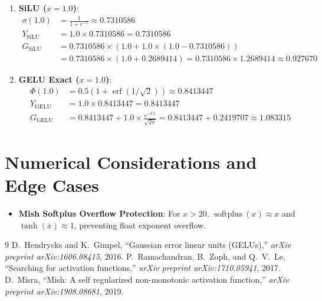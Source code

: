 \documentclass[11pt,a4paper]{article}
\theoremstyle{definition}
\begin{document}
\begin{enumerate}
    \item \textbf{SiLU ($x=1.0$)}:
    \begin{align}
    \sigma(1.0) &= \frac{1}{1 + e^{-1}} \approx 0.7310586 \\
    Y_{\text{SiLU}} &= 1.0 \times 0.7310586 = 0.7310586 \\
    G_{\text{SiLU}} &= 0.7310586 \times (1.0 + 1.0 \times (1.0 - 0.7310586)) \\
    &= 0.7310586 \times (1.0 + 0.2689414) = 0.7310586 \times 1.2689414 \approx 0.927670
    \end{align}
    \item \textbf{GELU Exact ($x=1.0$)}:
    \begin{align}
    \Phi(1.0) &= 0.5(1 + \operatorname{erf}(1/\sqrt{2})) \approx 0.8413447 \\
    Y_{\text{GELU}} &= 1.0 \times 0.8413447 = 0.8413447 \\
    G_{\text{GELU}} &= 0.8413447 + 1.0 \times \frac{e^{-0.5}}{\sqrt{2\pi}} = 0.8413447 + 0.2419707 \approx 1.083315
    \end{align}
\end{enumerate}

\section{Numerical Considerations and Edge Cases}

\begin{itemize}
    \item \textbf{Mish Softplus Overflow Protection}: For $x > 20$, $\operatorname{softplus}(x) \approx x$ and $\tanh(x) \approx 1$, preventing float exponent overflow.
\end{itemize}

\begin{thebibliography}{9}
 D.~Hendrycks and K.~Gimpel, ``Gaussian error linear units (GELUs),'' \emph{arXiv preprint arXiv:1606.08415}, 2016.
 P.~Ramachandran, B.~Zoph, and Q.~V.~Le, ``Searching for activation functions,'' \emph{arXiv preprint arXiv:1710.05941}, 2017.
 D.~Misra, ``Mish: A self regularized non-monotonic activation function,'' \emph{arXiv preprint arXiv:1908.08681}, 2019.
\end{thebibliography}
\end{document}
